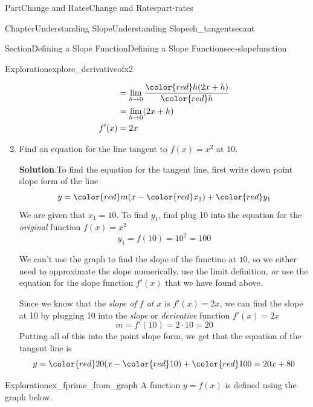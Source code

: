 \documentclass[oneside,10pt,]{tufte-book}
\newcommand{\blocktitlefont}{\relax}
\numberwithin{equation}{chapter}
\newcommand{\amp}{&}
\begin{document}
\begin{partptx}{Part}{Change and Rates}{}{Change and Rates}{}{}{part-rates}
\begin{chapterptx}{Chapter}{Understanding Slope}{}{Understanding Slope}{}{}{ch_tangentsecant}
\begin{sectionptx}{Section}{Defining a Slope Function}{}{Defining a Slope Function}{}{}{sec-slopefunction}
\begin{exploration}{Exploration}{}{explore_derivativeofx2}
\begin{enumerate}[font=\bfseries,label=(\alph*),ref=\alph*]
\begin{align*}
\amp =  \lim_{h\rightarrow 0}\dfrac{  {\color{red} h}(2x + h)  }{\color{red} h} \\
\amp =  \lim_{h\rightarrow 0} (2x + h)  \\
f'(x) \amp =  2x  
\end{align*}
%
\item{}Find an equation for the line tangent to \(f(x) = x^2\) at \(10\).%
\par\smallskip%
\noindent\textbf{\blocktitlefont Solution}.\hypertarget{explore_derivativeofx2-5-2}{}\quad{}To find the equation for the tangent line, first write down point slope form of the line%
\begin{equation*}
y = {\color{red} m } (x - {\color{red} x_1}) + {\color{red} y_1}
\end{equation*}
We are given that \(x_1=10\). To find \(y_1\), find plug 10 into the equation for the \emph{original} function \(f(x)=x^2\)%
\begin{equation*}
y_1 = f(10) = 10^2 = 100
\end{equation*}
%
\par
We can't use the graph to find the slope of the functino at \(10\), so we either need to approximate the slope numerically, use the limit definition, \emph{or} use the equation for the slope function \(f'(x)\) that we have found above.%
\par
Since we know that the \emph{slope of \(f\) at \(x\)} is \(f'(x) = 2x\), we can find the slope at 10 by plugging 10 into the \emph{slope} or \emph{derivative} function \(f'(x)=2x\)%
\begin{equation*}
m = f'(10) = 2\cdot 10 = 20
\end{equation*}
Putting all of this into the point slope form, we get that the equation of the tangent line is%
\begin{equation*}
y = {\color{red} 20} (x - {\color{red} 10}) + {\color{red} 100} 
= 20x +80
\end{equation*}
%
\end{enumerate}%
\end{exploration}%
\begin{exploration}{Exploration}{}{ex_fprime_from_graph}%
A function \(y=f(x)\) is defined using the graph below.%
\begin{image}{0.125}{0.75}{0.125}{}%
\resizebox{\linewidth}{!}{%
}
\end{image}
\end{exploration}
\end{sectionptx}
\end{chapterptx}
\end{partptx}
\end{document}
